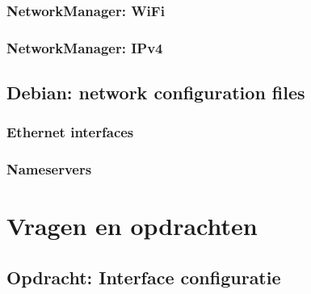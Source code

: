 \documentclass[a4paper,12pt,twoside,openright,titlepage]{book}
\begin{document}
\subsection{NetworkManager: WiFi}

\subsection{NetworkManager: IPv4}


\section{Debian: network configuration files}

\subsection{Ethernet interfaces}

\subsection{Nameservers}


\chapter{Vragen en opdrachten}
\section{Opdracht: Interface configuratie}


\printindex
\end{document}
